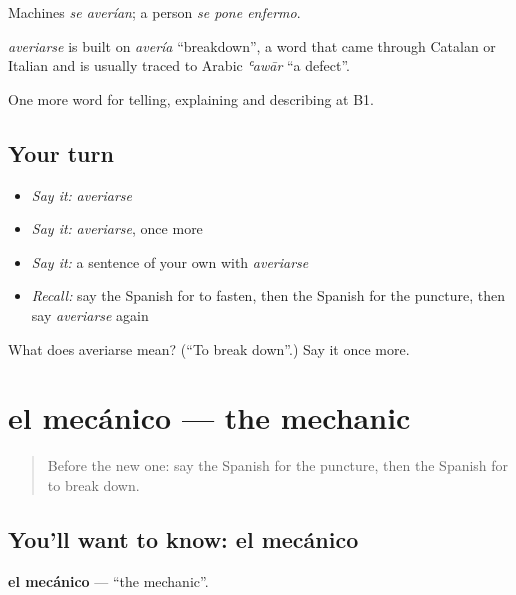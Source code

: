 Machines \emph{se averían}; a person \emph{se pone enfermo}.

\begin{cousinweb}
\emph{averiarse} is built on \emph{avería} \textquotedblleft{}breakdown\textquotedblright{}, a word that came through Catalan or Italian and is usually traced to Arabic \emph{ʿawār} \textquotedblleft{}a defect\textquotedblright{}.
\end{cousinweb}

\begin{grammarlens}[title={What you've built}]
One more word for telling, explaining and describing at B1.
\end{grammarlens}

\subsection*{Your turn}
\begin{itemize}
\raggedright
  \item \emph{Say it:} \emph{averiarse}
  \item \emph{Say it:} \emph{averiarse}, once more
  \item \emph{Say it:} a sentence of your own with \emph{averiarse}
  \item \emph{Recall:} say the Spanish for to fasten, then the Spanish for the puncture, then say \emph{averiarse} again
\end{itemize}

\begin{tcolorbox}[breakable,colback=teal!4,colframe=teal!35!black,title={Before you move on}]
What does averiarse mean? (\textquotedblleft{}To break down\textquotedblright{}.) Say it once more.
\end{tcolorbox}
\section[el mecánico]{el mecánico — the mechanic}

\label{lesson:ES-C645-mecanico}



\begin{quote}
Before the new one: say the Spanish for the puncture, then the Spanish for to break down.
\end{quote}

\subsection*{You'll want to know: el mecánico}
\textbf{el mecánico} — \textquotedblleft{}the mechanic\textquotedblright{}.

